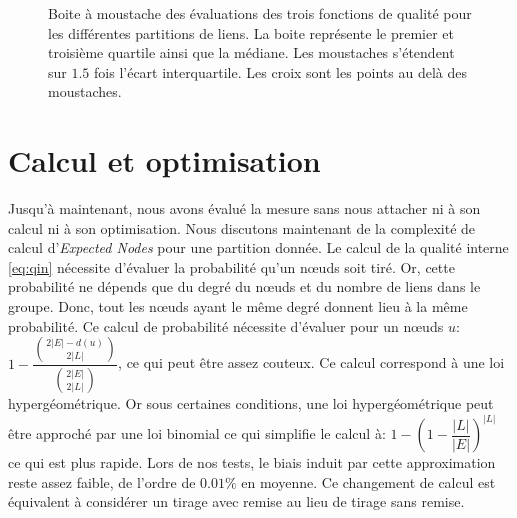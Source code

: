 \begin{figure}
\centering

	\caption{Boite à moustache des évaluations des trois fonctions de qualité pour les différentes partitions de liens. 
	La boite représente le premier et troisième quartile ainsi que la médiane.
	Les moustaches s'étendent sur $1.5$ fois l'écart interquartile. 
	Les croix sont les points au delà des moustaches.
	}
	\label{fig:LF}
\end{figure}

\section{Calcul et optimisation}
Jusqu'à maintenant, nous avons évalué la mesure sans nous attacher ni à son calcul ni à son optimisation.
Nous discutons maintenant de la complexité de calcul d'\emph{Expected Nodes} pour une partition donnée.
Le calcul de la qualité interne \ref{eq:qin} nécessite d'évaluer la probabilité qu'un n\oe uds soit tiré.
Or, cette probabilité ne dépends que du degré du n\oe uds et du nombre de liens dans le groupe.
Donc, tout les n\oe uds ayant le même degré donnent lieu à la même probabilité.
Ce calcul de probabilité nécessite d'évaluer pour un n\oe uds $u$: $1 - \dfrac{ \binom{2|E|-d(u)}{2|L|} }{ \binom{2|E|}{2|L|} }$, ce qui peut être assez couteux.
Ce calcul correspond à une loi hypergéométrique.
Or sous certaines conditions, une loi hypergéométrique peut être approché par une loi binomial ce qui simplifie le calcul à: $1 - (1- \dfrac{|L|}{|E|})^{|L|}$ ce qui est plus rapide.
Lors de nos tests, le biais induit par cette approximation reste assez faible, de l'ordre de $0.01\%$ en moyenne.
Ce changement de calcul est équivalent à considérer un tirage avec remise au lieu de tirage sans remise.

